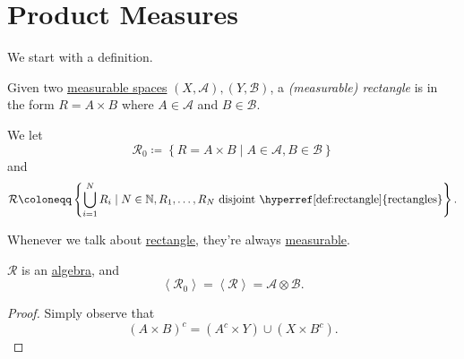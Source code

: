 \section{Product Measures}
We start with a definition.

\begin{definition}[Rectangle]\label{def:rectangle}
	Given two \hyperref[def:measurable-space]{measurable spaces} \((X, \mathcal{A} ), (Y, \mathcal{B} )\), a \emph{(measurable) rectangle} is in the form \(R = A\times B\) where \(A\in \mathcal{A} \) and \(B\in \mathcal{B} \).
\end{definition}

\begin{notation}
	We let
	\[
		\mathcal{R} _0 \coloneqq \left\{R = A\times B \mid A\in \mathcal{A} , B\in \mathcal{B} \right\}
	\]
	and
	\[
		\mathcal{R} \coloneqq \left\{\bigcup_{i=1}^{N} R_{i} \mid N\in \mathbb{N} , R_1, \dots , R_N \text{ disjoint \hyperref[def:rectangle]{rectangles}}\right\}.
	\]
\end{notation}

\begin{note}
	Whenever we talk about \hyperref[def:rectangle]{rectangle}, they're always \hyperref[def:measurable-set]{measurable}.
\end{note}

\begin{lemma}
	\(\mathcal{R} \) is an \hyperref[def:algebra]{algebra}, and
	\[
		\left< \mathcal{R} _0 \right> = \left< \mathcal{R}  \right> = \mathcal{A} \otimes \mathcal{B}.
	\]
\end{lemma}
\begin{proof}
	Simply observe that
	\[
		(A\times B)^{c} = (A^{c} \times Y)\cup (X\times B^{c} ).
	\]
\end{proof}
